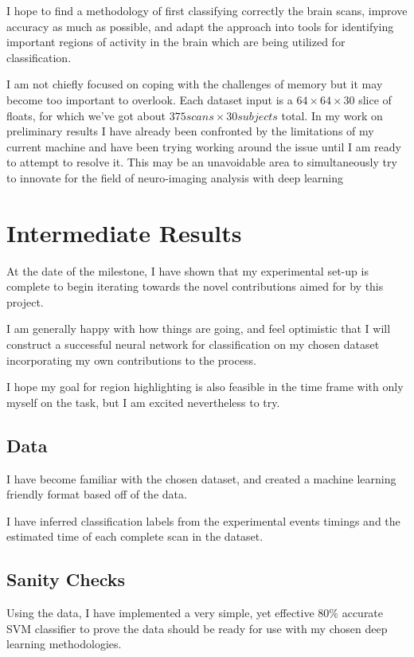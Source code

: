\documentclass[10pt,twocolumn,letterpaper]{article}
\begin{document}
I hope to find a methodology of first classifying correctly the brain scans, improve accuracy as much as possible,
and adapt the approach into tools for identifying important regions of activity in the
brain which are being utilized for classification.

I am not chiefly focused on coping with the challenges of memory but it may become too important to overlook.
Each dataset input is a $64 \times 64 \times 30$ slice of floats, for which we've got
about $375 scans \times 30 subjects$ total.
In my work on preliminary results I have already been confronted by the limitations of my current machine and have
been trying working around the issue until I am ready to attempt to resolve it.
This may be an unavoidable area to simultaneously try to innovate for the field of
neuro-imaging analysis with deep learning


\section{Intermediate Results}\label{sec:intermediate-results}
At the date of the milestone, I have shown that my experimental set-up is complete to begin
iterating towards the novel contributions aimed for by this project.

I am generally happy with how things are going, and feel optimistic that I will construct a successful neural
network for classification on my chosen dataset incorporating my own contributions to the process.

I hope my goal for region highlighting is also feasible in the time frame with only myself on the task, but I am
excited nevertheless to try.

\subsection{Data}\label{subsec:data}
I have become familiar with the chosen dataset, and created a machine learning friendly format
based off of the data.

I have inferred classification labels from the experimental events timings and the estimated time
of each complete scan in the dataset.

\subsection{Sanity Checks}\label{subsec:sanity-checks}
Using the data, I have implemented a very simple, yet effective 80\% accurate SVM classifier to prove the data
should be ready for use with my chosen deep learning methodologies.
\end{document}
